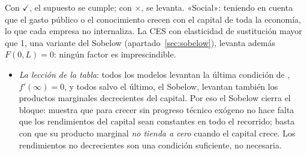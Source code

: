 \documentclass[11pt]{article}
\begin{document}
\begin{table}[H]
\smallskip
{\footnotesize Con \textcolor{tceeverde}{$\checkmark$}, el supuesto se cumple; con \textcolor{tceerojo}{$\times$}, se levanta. «Social»: teniendo en cuenta que el gasto público o el conocimiento crecen con el capital de toda la economía, lo que cada empresa no internaliza. La CES con elasticidad de sustitución mayor que 1, una variante del Sobelow (apartado~\ref{sec:sobelow}), levanta además $F(0,L)=0$: ningún factor es imprescindible.}
\end{table}

\begin{itemize}
\item \emph{La lección de la tabla}: todos los modelos levantan la última condición de , $f'(\infty)=0$, y todos salvo el último, el Sobelow, levantan también los productos marginales decrecientes del capital. Por eso el Sobelow cierra el bloque: muestra que para crecer sin progreso técnico exógeno no hace falta que los rendimientos del capital sean constantes en todo el recorrido; basta con que su producto marginal \emph{no tienda a cero} cuando el capital crece. Los rendimientos no decrecientes son una condición suficiente, no necesaria\nocite{JonesManuelli1990}.
\end{itemize}
\end{document}
